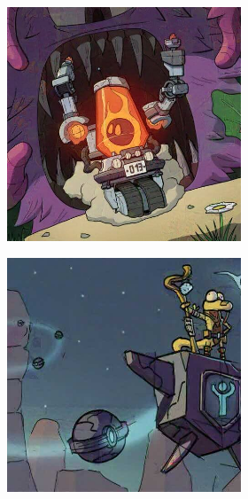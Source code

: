 \documentclass{article}
\begin{document}
\begin{figure}[h]
    \centering
    \begin{subfigure}[t]{\textwidth}
        \begin{subfigure}[b]{0.24\textwidth}
         \centering
         \includegraphics[width=\textwidth]{plots/process/glaze/0000.jpg}
     \end{subfigure}
     \hfill
     \begin{subfigure}[b]{0.24\textwidth}
         \centering
         \includegraphics[width=\textwidth]{plots/process/glaze/0001.jpg}

\end{subfigure}
\end{subfigure}
\end{figure}
\end{document}
